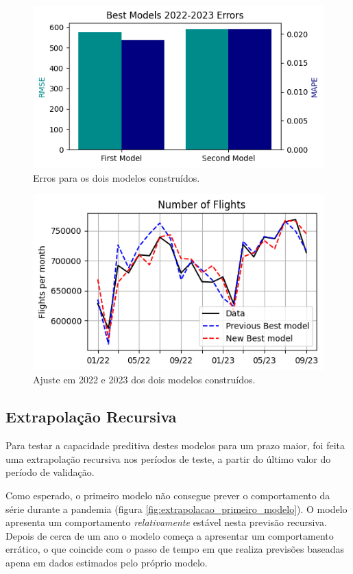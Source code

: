 \documentclass[final,5p]{elsarticle}
\numberwithin{equation}{section}
\begin{document}
        \begin{figure}[hbt!]
            \includegraphics[width=0.95\columnwidth]{C3_RMSE.png}
            \caption{Erros para os dois modelos construídos.}
            \label{fig:erros_modelos}
        \end{figure}

        \begin{figure}[hbt!]
            \includegraphics[width=0.95\columnwidth]{C3_BestModel22_23.png}
            \caption{Ajuste em 2022 e 2023 dos dois modelos construídos.}
            \label{fig:ajuste_modelos}
        \end{figure}

        \subsection{Extrapolação Recursiva}

        Para testar a capacidade preditiva destes modelos para um prazo maior, foi feita uma extrapolação recursiva nos períodos de teste, a partir do último valor do período de validação.

        Como esperado, o primeiro modelo não consegue prever o comportamento da série durante a pandemia (figura \ref{fig:extrapolacao_primeiro_modelo}). O modelo apresenta um comportamento \emph{relativamente} estável nesta previsão recursiva. Depois de cerca de um ano o modelo começa a apresentar um comportamento errático, o que coincide com o passo de tempo em que realiza previsões baseadas apena em dados estimados pelo próprio modelo.
\end{document}
